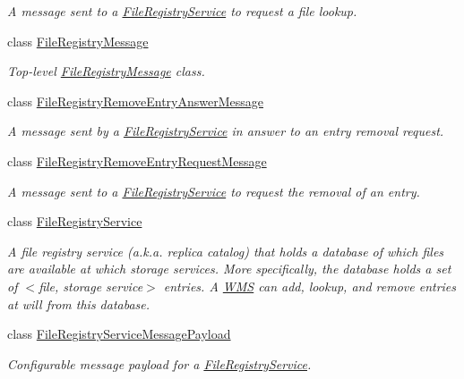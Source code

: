 \begin{DoxyCompactItemize}
\begin{DoxyCompactList}\small\item\em A message sent to a \hyperlink{classwrench_1_1_file_registry_service}{File\+Registry\+Service} to request a file lookup. \end{DoxyCompactList}\item 
class \hyperlink{classwrench_1_1_file_registry_message}{File\+Registry\+Message}
\begin{DoxyCompactList}\small\item\em Top-\/level \hyperlink{classwrench_1_1_file_registry_message}{File\+Registry\+Message} class. \end{DoxyCompactList}\item 
class \hyperlink{classwrench_1_1_file_registry_remove_entry_answer_message}{File\+Registry\+Remove\+Entry\+Answer\+Message}
\begin{DoxyCompactList}\small\item\em A message sent by a \hyperlink{classwrench_1_1_file_registry_service}{File\+Registry\+Service} in answer to an entry removal request. \end{DoxyCompactList}\item 
class \hyperlink{classwrench_1_1_file_registry_remove_entry_request_message}{File\+Registry\+Remove\+Entry\+Request\+Message}
\begin{DoxyCompactList}\small\item\em A message sent to a \hyperlink{classwrench_1_1_file_registry_service}{File\+Registry\+Service} to request the removal of an entry. \end{DoxyCompactList}\item 
class \hyperlink{classwrench_1_1_file_registry_service}{File\+Registry\+Service}
\begin{DoxyCompactList}\small\item\em A file registry service (a.\+k.\+a. replica catalog) that holds a database of which files are available at which storage services. More specifically, the database holds a set of $<$file, storage service$>$ entries. A \hyperlink{classwrench_1_1_w_m_s}{W\+MS} can add, lookup, and remove entries at will from this database. \end{DoxyCompactList}\item 
class \hyperlink{classwrench_1_1_file_registry_service_message_payload}{File\+Registry\+Service\+Message\+Payload}
\begin{DoxyCompactList}\small\item\em Configurable message payload for a \hyperlink{classwrench_1_1_file_registry_service}{File\+Registry\+Service}. \end{DoxyCompactList}\item 

\end{DoxyCompactItemize}
